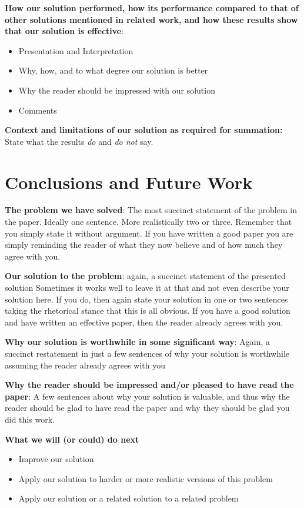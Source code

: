 \documentclass[pdf,bookmarks,colorlinks=true]{IEEEtran}
\begin{document}
\textbf{How our solution performed, how its performance compared to
that of other solutions mentioned in related work, and how these results show
that our solution is effective}:

\begin{itemize}
\item   Presentation and Interpretation
\item   Why, how, and to what degree our solution is better
\item   Why the reader should be impressed with our solution
\item   Comments

\end{itemize}


\textbf{Context and limitations of our solution as required for
summation:} State what the results {\em do} and {\em do not} say.



\section{Conclusions and Future Work}
\label{sec:Conclusion}

\textbf{The problem we have solved}: The most succinct statement of the problem in the paper. Ideally one
sentence. More realistically two or three. Remember that you simply state it
without argument. If you have written a good paper you are simply reminding the
reader of what they now believe and of how much they agree with you.



\textbf{Our solution to the problem}: again, a succinct statement of the presented solution
Sometimes it works well to leave it at that and not even describe your
solution here. If you do, then again state your solution in one or two
sentences taking the rhetorical stance that this is all obvious. If you have a
good solution and have written an effective paper, then the reader already
agrees with you.

\textbf{Why our solution is worthwhile in some significant way}:
Again, a succinct restatement in just a few sentences of why your solution is
worthwhile assuming the reader already agrees with you

\textbf{Why the reader should be impressed and/or pleased to have read the paper}:
A few sentences about why your solution is valuable, and thus why the
reader should be glad to have read the paper and why they should be glad you
did this work.



\textbf{What we will (or could) do next}

\begin{itemize}
\item   Improve our solution
\item   Apply our solution to harder or more realistic versions of this problem
\item   Apply our solution or a related solution to a related problem

\end{itemize}




\end{document}
